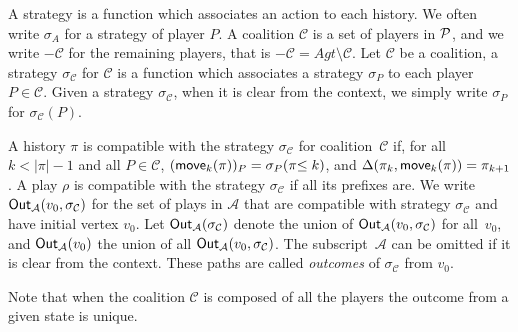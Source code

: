 \def\Coalition{\ensuremath{\mathcal{C}}}
\begin{definition}
  A strategy is a function which associates an action to each history.
  We often write $\sigma_A$ for a strategy of player $P$.
  A coalition $\Coalition$ is a set of players in $\mathcal{P}$, and we write
  $-\Coalition$ for the remaining players, that is $-\Coalition = Agt \setminus \Coalition$.
  Let \(\Coalition\) be a coalition, a strategy \(\sigma_\Coalition\) for \(\Coalition\) is a function
  which associates a strategy \(\sigma_P\) to each player \(P\in \Coalition\).
  Given a strategy $\sigma_\Coalition$, when it is clear from the context, we simply
  write \(\sigma_P\) for \(\sigma_\Coalition(P)\).
\end{definition}

\begin{definition}[Outcomes]
  A history \(\pi\) is compatible
  with the strategy \(\sigma_\Coalition\) for coalition~$\Coalition$ if, for all \(k < |\pi| - 1\) and all
  \(P \in \Coalition\), \((\textsf{move}_k(\pi))_P = \sigma_P(\pi{\le k})\), and
  \(\Delta(\pi_k, \textsf{move}_k(\pi)) = \pi_{k+1}\). A play \(\rho\) is compatible with
  the strategy \(\sigma_\Coalition\) if all its prefixes are. We write
  \(\Out_{\mathcal{A}}(v_0, \sigma_\Coalition)\) for the set of plays in \(\mathcal{A}\) that
  are compatible with strategy \(\sigma_\Coalition\) and have initial vertex
  \(v_0\). Let \(\Out_{\mathcal{A}}(\sigma_\Coalition)\) denote the union
  of \(\Out_{\mathcal{A}}(v_0, \sigma_\Coalition)\) for all~$v_0$,
  and \(\textsf{Out}_{\mathcal{A}}(v_0)\) the union of all \(\Out_{\mathcal{A}}(v_0, \sigma_\Coalition)\).
  The subscript~$\mathcal{A}$ can be omitted if it is clear from the context.
  These paths are called \emph{outcomes} of \(\sigma_\Coalition\) from
  \(v_0\). 
\end{definition}
Note that
when the coalition \(\Coalition\) is composed of all the players
the outcome from a given state is unique.


